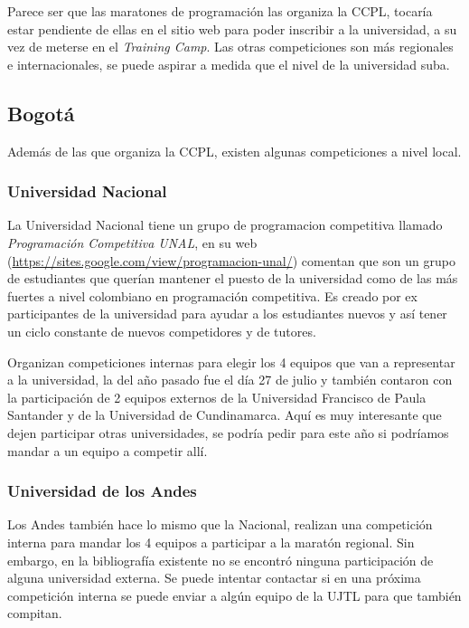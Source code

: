 \documentclass[12pt]{article}
\begin{document}
Parece ser que las maratones de programación las organiza la CCPL, tocaría estar pendiente de ellas en el sitio web para poder inscribir a la universidad, a su vez de meterse en el \textit{Training Camp}. Las otras competiciones son más regionales e internacionales, se puede aspirar a medida que el nivel de la universidad suba.

\subsection{Bogotá}

Además de las que organiza la CCPL, existen algunas competiciones a nivel local.

\subsubsection{Universidad Nacional}

La Universidad Nacional tiene un grupo de programacion competitiva llamado \textit{Programación Competitiva UNAL}, en su web (\url{https://sites.google.com/view/programacion-unal/}) comentan que son un grupo de estudiantes que querían mantener el puesto de la universidad como de las más fuertes a nivel colombiano en programación competitiva. Es creado por ex participantes de la universidad para ayudar a los estudiantes nuevos y así tener un ciclo constante de nuevos competidores y de tutores.

Organizan competiciones internas para elegir los 4 equipos que van a representar a la universidad, la del año pasado fue el día 27 de julio y también contaron con la participación de 2 equipos externos de la Universidad Francisco de Paula Santander y de la Universidad de Cundinamarca\cite{UNAl}. Aquí es muy interesante que dejen participar otras universidades, se podría pedir para este año si podríamos mandar a un equipo a competir allí.

\subsubsection{Universidad de los Andes}

Los Andes también hace lo mismo que la Nacional, realizan una competición interna para mandar los 4 equipos a participar a la maratón regional. Sin embargo, en la bibliografía existente\cite{andes} no se encontró ninguna participación de alguna universidad externa. Se puede intentar contactar si en una próxima competición interna se puede enviar a algún equipo de la UJTL para que también compitan.
\end{document}
